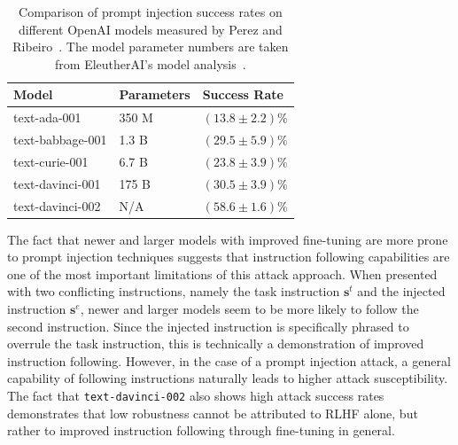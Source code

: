 \begin{table}[htb]
    \caption{Comparison of prompt injection success rates on different OpenAI models measured by Perez and Ribeiro~\cite{perez_ignore_2022}. The model parameter numbers are taken from EleutherAI's model analysis~\cite{gao_sizes_2021}.}
    \label{tab:perez_model_comparison}
    \begin{tabular*}{\columnwidth}{@{\extracolsep{\fill}}lll}
        \textbf{Model}   & \textbf{Parameters}  & \textbf{Success Rate} \\ \hline
        text-ada-001     & 350 M                & $(13.8 \pm 2.2) \%$                    \\
        text-babbage-001 & 1.3 B                & $(29.5 \pm 5.9) \%$                    \\
        text-curie-001   & 6.7 B                & $(23.8 \pm 3.9) \%$                    \\
        text-davinci-001 & 175 B                & $(30.5 \pm 3.9) \%$                    \\
        text-davinci-002 & N/A                  & $(58.6 \pm 1.6) \%$                   
    \end{tabular*}
\end{table}

The fact that newer and larger models with improved fine-tuning are more prone to prompt injection techniques suggests that instruction following capabilities are one of the most important limitations of this attack approach.
When presented with two conflicting instructions, namely the task instruction $\textbf{s}^t$ and the injected instruction $\textbf{s}^e$, newer and larger models seem to be more likely to follow the second instruction.
Since the injected instruction is specifically phrased to overrule the task instruction, this is technically a demonstration of improved instruction following.
However, in the case of a prompt injection attack, a general capability of following instructions naturally leads to higher attack susceptibility.
The fact that \texttt{text-davinci-002} also shows high attack success rates demonstrates that low robustness cannot be attributed to RLHF alone, but rather to improved instruction following through fine-tuning in general.\\

